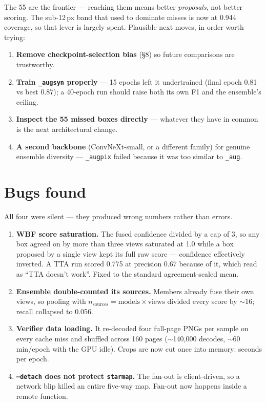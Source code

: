 \documentclass[11pt,a4paper]{article}
\begin{document}
The 55 are the frontier --- reaching them means better \emph{proposals}, not better scoring. The
sub-12\,px band that used to dominate misses is now at 0.944 coverage, so that lever is largely
spent. Plausible next moves, in order worth trying:

\begin{enumerate}[leftmargin=1.6em]
\item \textbf{Remove checkpoint-selection bias} (\S 8) so future comparisons are trustworthy.
\item \textbf{Train \texttt{\_augsyn} properly} --- 15 epochs left it undertrained (final epoch
0.81 vs best 0.87); a 40-epoch run should raise both its own F1 and the ensemble's ceiling.
\item \textbf{Inspect the 55 missed boxes directly} --- whatever they have in common is the next
architectural change.
\item \textbf{A second backbone} (ConvNeXt-small, or a different family) for genuine ensemble
diversity --- \texttt{\_augpix} failed because it was too similar to \texttt{\_aug}.
\end{enumerate}

\section{Bugs found}

All four were silent --- they produced wrong numbers rather than errors.

\begin{enumerate}[leftmargin=1.6em]
\item \textbf{WBF score saturation.} The fused confidence divided by a cap of 3, so any box agreed
on by more than three views saturated at 1.0 while a box proposed by a single view kept its full
raw score --- confidence effectively inverted. A TTA run scored 0.775 at precision 0.67 because of
it, which read as ``TTA doesn't work''. Fixed to the standard agreement-scaled mean.
\item \textbf{Ensemble double-counted its sources.} Members already fuse their own views, so
pooling with $n_{\mathrm{sources}} = \mathrm{models}\times\mathrm{views}$ divided every score by
$\sim$16; recall collapsed to 0.056.
\item \textbf{Verifier data loading.} It re-decoded four full-page PNGs per sample on every cache
miss and shuffled across 160 pages ($\sim$140{,}000 decodes, $\sim$60 min/epoch with the GPU
idle). Crops are now cut once into memory: seconds per epoch.
\item \textbf{\texttt{--detach} does not protect \texttt{starmap}.} The fan-out is client-driven,
so a network blip killed an entire five-way map. Fan-out now happens inside a remote function.
\end{enumerate}
\end{document}
